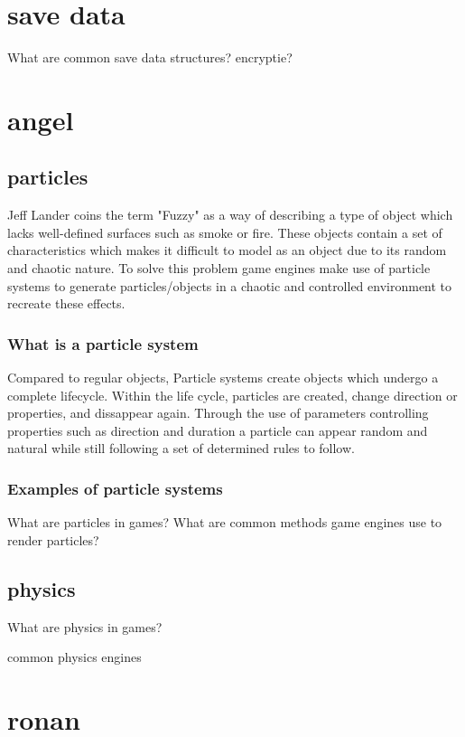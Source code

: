 \documentclass{article} %
\begin{document}
\section{save data}
What are common save data structures?
encryptie? 
\newpage

\section{angel}
\subsection{particles}

Jeff Lander coins the term "Fuzzy" as a way of describing a type of object which lacks well-defined surfaces such as smoke or fire. \cite{Lander_1998} These objects contain a set of characteristics which makes it difficult to model as an object due to its random and chaotic nature. To solve this problem game engines make use of particle systems to generate particles/objects in a chaotic and controlled environment to recreate these effects.

\subsubsection{What is a particle system}

Compared to regular objects, Particle systems create objects which undergo a complete lifecycle. Within the life cycle, particles are created, change direction or properties, and dissappear again. Through the use of parameters controlling properties such as direction and duration a particle can appear random and natural while still following a set of determined rules to follow.

\subsubsection{Examples of particle systems}



What are particles in games?
What are common methods game engines use to render particles?
\subsection{physics}
What are physics in games?

common physics engines

\newpage

\section{ronan}
\end{document}
